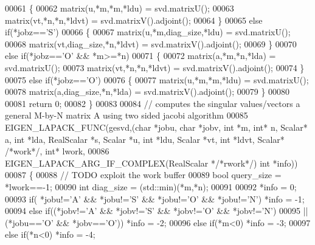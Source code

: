 \begin{DoxyCode}
00061   \{
00062     matrix(u,*m,*m,*ldu)   = svd.matrixU();
00063     matrix(vt,*n,*n,*ldvt) = svd.matrixV().adjoint();
00064   \}
00065   \textcolor{keywordflow}{else} \textcolor{keywordflow}{if}(*jobz==\textcolor{charliteral}{'S'})
00066   \{
00067     matrix(u,*m,diag\_size,*ldu)   = svd.matrixU();
00068     matrix(vt,diag\_size,*n,*ldvt) = svd.matrixV().adjoint();
00069   \}
00070   \textcolor{keywordflow}{else} \textcolor{keywordflow}{if}(*jobz==\textcolor{charliteral}{'O'} && *m>=*n)
00071   \{
00072     matrix(a,*m,*n,*lda)   = svd.matrixU();
00073     matrix(vt,*n,*n,*ldvt) = svd.matrixV().adjoint();
00074   \}
00075   \textcolor{keywordflow}{else} \textcolor{keywordflow}{if}(*jobz==\textcolor{charliteral}{'O'})
00076   \{
00077     matrix(u,*m,*m,*ldu)        = svd.matrixU();
00078     matrix(a,diag\_size,*n,*lda) = svd.matrixV().adjoint();
00079   \}
00080     
00081   \textcolor{keywordflow}{return} 0;
00082 \}
00083 
00084 \textcolor{comment}{// computes the singular values/vectors a general M-by-N matrix A using two sided jacobi algorithm}
00085 EIGEN\_LAPACK\_FUNC(gesvd,(\textcolor{keywordtype}{char} *jobu, \textcolor{keywordtype}{char} *jobv, \textcolor{keywordtype}{int} *m, \textcolor{keywordtype}{int}* n, Scalar* a, \textcolor{keywordtype}{int} *lda, RealScalar *s, Scalar
       *u, \textcolor{keywordtype}{int} *ldu, Scalar *vt, \textcolor{keywordtype}{int} *ldvt, Scalar* \textcolor{comment}{/*work*/}, \textcolor{keywordtype}{int}* lwork,
00086                          EIGEN\_LAPACK\_ARG\_IF\_COMPLEX(RealScalar *\textcolor{comment}{/*rwork*/}) \textcolor{keywordtype}{int} *info))
00087 \{
00088   \textcolor{comment}{// TODO exploit the work buffer}
00089   \textcolor{keywordtype}{bool} query\_size = *lwork==-1;
00090   \textcolor{keywordtype}{int} diag\_size = (std::min)(*m,*n);
00091   
00092   *info = 0;
00093         \textcolor{keywordflow}{if}( *jobu!=\textcolor{charliteral}{'A'} && *jobu!=\textcolor{charliteral}{'S'} && *jobu!=\textcolor{charliteral}{'O'} && *jobu!=\textcolor{charliteral}{'N'}) *info = -1;
00094   \textcolor{keywordflow}{else}  \textcolor{keywordflow}{if}((*jobv!=\textcolor{charliteral}{'A'} && *jobv!=\textcolor{charliteral}{'S'} && *jobv!=\textcolor{charliteral}{'O'} && *jobv!=\textcolor{charliteral}{'N'})
00095            || (*jobu==\textcolor{charliteral}{'O'} && *jobv==\textcolor{charliteral}{'O'}))                         *info = -2;
00096   \textcolor{keywordflow}{else}  \textcolor{keywordflow}{if}(*m<0)                                                  *info = -3;
00097   \textcolor{keywordflow}{else}  \textcolor{keywordflow}{if}(*n<0)                                                  *info = -4;

\end{DoxyCode}
